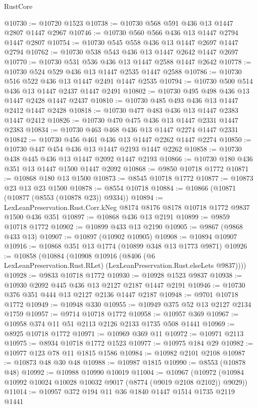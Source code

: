 \begin{lexlean}{RustCore}
\begin{coremodule}
@10730 := @10720 @1523
@10738 := @10730 @568 @591 @436 @13 @1447 @2807 @1447 @2967
@10746 := @10730 @560 @566 @436 @13 @1447 @2794 @1447 @2807
@10754 := @10730 @545 @558 @436 @13 @1447 @2697 @1447 @2794
@10762 := @10730 @538 @543 @436 @13 @1447 @2642 @1447 @2697
@10770 := @10730 @531 @536 @436 @13 @1447 @2588 @1447 @2642
@10778 := @10730 @524 @529 @436 @13 @1447 @2535 @1447 @2588
@10786 := @10730 @516 @522 @436 @13 @1447 @2491 @1447 @2535
@10794 := @10730 @500 @514 @436 @13 @1447 @2437 @1447 @2491
@10802 := @10730 @495 @498 @436 @13 @1447 @2428 @1447 @2437
@10810 := @10730 @485 @493 @436 @13 @1447 @2412 @1447 @2428
@10818 := @10730 @477 @483 @436 @13 @1447 @2383 @1447 @2412
@10826 := @10730 @470 @475 @436 @13 @1447 @2331 @1447 @2383
@10834 := @10730 @463 @468 @436 @13 @1447 @2274 @1447 @2331
@10842 := @10730 @456 @461 @436 @13 @1447 @2262 @1447 @2274
@10850 := @10730 @447 @454 @436 @13 @1447 @2193 @1447 @2262
@10858 := @10730 @438 @445 @436 @13 @1447 @2092 @1447 @2193
@10866 := @10730 @180 @436 @351 @13 @1447 @1500 @1447 @2092
@10868 := @9850 @10718 @1772
@10871 := @10868 @180 @13 @1500
@10873 := @8545 @10718 @1772
@10877 := @10873 @23 @13 @23 @1500
@10878 := @8554 @10718
@10884 := @10866 (@10871 (@10877 (@8553 (@10878 @23)) @9334))
@10894 := LexLeanPreservation.Rust.Corr.kNeg @8174 @8176 @8178 @10718 @1772 @9837 @1500 @436 @351
@10897 := @10868 @436 @13 @2191
@10899 := @9859 @10718 @1772
@10902 := @10899 @433 @13 @2190
@10905 := @9867 (@9868 @433 @13)
@10907 := @10897 (@10902 @10905)
@10908 := @10894 @10907
@10916 := @10868 @351 @13 @1774 (@10899 @348 @13 @1773 @9871)
@10926 := @10858
    (@10884
      (@10908
        @10916
        (@8406 (@6 LexLeanPreservation.Rust.RLet) (LexLeanPreservation.Rust.elseLets @9837))))
@10928 := @9833 @10718 @1772
@10930 := @10928 @1523 @9837
@10938 := @10930 @2092 @445 @436 @13 @2127 @2187 @1447 @2191
@10946 := @10730 @376 @351 @444 @13 @2127 @2136 @1447 @2187
@10948 := @9701 @10718 @1772
@10949 := @10948 @330
@10955 := @10949 @375 @52 @13 @2127 @2134 @1759
@10957 := @9714 @10718 @1772
@10958 := @10957 @369
@10967 := @10958 @374 @11 @51 @2113 @2126 @2133 @1735 @508 @1441
@10969 := @8925 @10718 @1772
@10971 := @10969 @369 @11
@10972 := @10971 @2113
@10975 := @8934 @10718 @1772 @1523
@10977 := @10975 @184 @29
@10982 := @10977 @123 @78 @11 @1815 @1586
@10984 := @10982 @2101 @2108
@10987 := @10873 @48 @30 @48
@10988 := @10987 @1815
@10990 := @8553 (@10878 @48)
@10992 := @10988 @10990 @10019
@11004 := @10967
    (@10972 (@10984 @10992 @10024 @10028 @10032 @9017 (@8774 (@9019 @2108 @2102)) @9029))
@11014 := @10957 @372 @194 @11 @36 @1840 @1447 @1514 @1735 @2119 @1441

\end{coremodule}
\end{lexlean}
